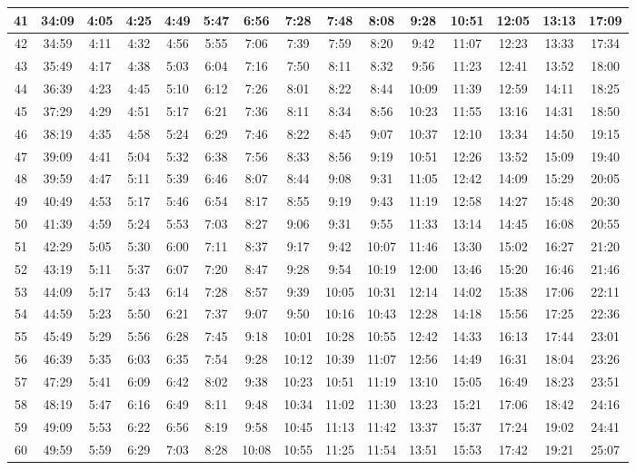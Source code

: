 \begin{scriptsize}
\begin{tabular}{c | c | c | c | c | c | c | c | c | c | c | c | c | c | c}
		41&34:09&4:05&4:25&4:49&5:47&6:56&7:28&7:48&8:08&9:28&10:51&12:05&13:13&17:09\\\hline
		42&34:59&4:11&4:32&4:56&5:55&7:06&7:39&7:59&8:20&9:42&11:07&12:23&13:33&17:34\\\hline
		43&35:49&4:17&4:38&5:03&6:04&7:16&7:50&8:11&8:32&9:56&11:23&12:41&13:52&18:00\\\hline
		44&36:39&4:23&4:45&5:10&6:12&7:26&8:01&8:22&8:44&10:09&11:39&12:59&14:11&18:25\\\hline
		45&37:29&4:29&4:51&5:17&6:21&7:36&8:11&8:34&8:56&10:23&11:55&13:16&14:31&18:50\\\hline
		46&38:19&4:35&4:58&5:24&6:29&7:46&8:22&8:45&9:07&10:37&12:10&13:34&14:50&19:15\\\hline
		47&39:09&4:41&5:04&5:32&6:38&7:56&8:33&8:56&9:19&10:51&12:26&13:52&15:09&19:40\\\hline
		48&39:59&4:47&5:11&5:39&6:46&8:07&8:44&9:08&9:31&11:05&12:42&14:09&15:29&20:05\\\hline
		49&40:49&4:53&5:17&5:46&6:54&8:17&8:55&9:19&9:43&11:19&12:58&14:27&15:48&20:30\\\hline
		50&41:39&4:59&5:24&5:53&7:03&8:27&9:06&9:31&9:55&11:33&13:14&14:45&16:08&20:55\\\hline
		51&42:29&5:05&5:30&6:00&7:11&8:37&9:17&9:42&10:07&11:46&13:30&15:02&16:27&21:20\\\hline
		52&43:19&5:11&5:37&6:07&7:20&8:47&9:28&9:54&10:19&12:00&13:46&15:20&16:46&21:46\\\hline
		53&44:09&5:17&5:43&6:14&7:28&8:57&9:39&10:05&10:31&12:14&14:02&15:38&17:06&22:11\\\hline
		54&44:59&5:23&5:50&6:21&7:37&9:07&9:50&10:16&10:43&12:28&14:18&15:56&17:25&22:36\\\hline
		55&45:49&5:29&5:56&6:28&7:45&9:18&10:01&10:28&10:55&12:42&14:33&16:13&17:44&23:01\\\hline
		56&46:39&5:35&6:03&6:35&7:54&9:28&10:12&10:39&11:07&12:56&14:49&16:31&18:04&23:26\\\hline
		57&47:29&5:41&6:09&6:42&8:02&9:38&10:23&10:51&11:19&13:10&15:05&16:49&18:23&23:51\\\hline
		58&48:19&5:47&6:16&6:49&8:11&9:48&10:34&11:02&11:30&13:23&15:21&17:06&18:42&24:16\\\hline
		59&49:09&5:53&6:22&6:56&8:19&9:58&10:45&11:13&11:42&13:37&15:37&17:24&19:02&24:41\\\hline
		60&49:59&5:59&6:29&7:03&8:28&10:08&10:55&11:25&11:54&13:51&15:53&17:42&19:21&25:07\\\hline
\end{tabular}\end{scriptsize}

